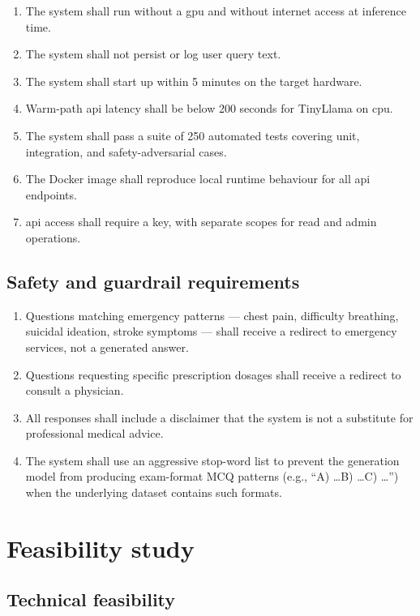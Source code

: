 \begin{enumerate}
    \item The system shall run without a \ac{gpu} and without internet access at inference time.
    \item The system shall not persist or log user query text.
    \item The system shall start up within 5 minutes on the target hardware.
    \item Warm-path \ac{api} latency shall be below 200 seconds for TinyLlama on \ac{cpu}.
    \item The system shall pass a suite of 250 automated tests covering unit, integration, and safety-adversarial cases.
    \item The Docker image shall reproduce local runtime behaviour for all \ac{api} endpoints.
    \item \ac{api} access shall require a key, with separate scopes for read and admin operations.
\end{enumerate}

\subsection{Safety and guardrail requirements}

\begin{enumerate}
    \item Questions matching emergency patterns --- chest pain, difficulty breathing, suicidal ideation, stroke symptoms --- shall receive a redirect to emergency services, not a generated answer.
    \item Questions requesting specific prescription dosages shall receive a redirect to consult a physician.
    \item All responses shall include a disclaimer that the system is not a substitute for professional medical advice.
    \item The system shall use an aggressive stop-word list to prevent the generation model from producing exam-format MCQ patterns (e.g., ``A) \ldots B) \ldots C) \ldots'') when the underlying dataset contains such formats.
\end{enumerate}

\section{Feasibility study}

\subsection{Technical feasibility}

